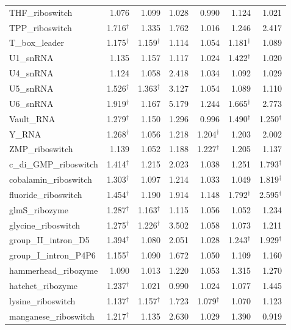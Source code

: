 \documentclass[11pt]{article}
\begin{document}
\begin{longtable}{@{}lrrrrrr@{}}
THF\_riboswitch & 1.076 & 1.099 & 1.028 & 0.990 & 1.124 & 1.021 \\
TPP\_riboswitch & 1.716$^\dagger$ & 1.335 & 1.762 & 1.016 & 1.246 & 2.417 \\
T\_box\_leader & 1.175$^\dagger$ & 1.159$^\dagger$ & 1.114 & 1.054 & 1.181$^\dagger$ & 1.089 \\
U1\_snRNA & 1.135 & 1.157 & 1.117 & 1.024 & 1.422$^\dagger$ & 1.020 \\
U4\_snRNA & 1.124 & 1.058 & 2.418 & 1.034 & 1.092 & 1.029 \\
U5\_snRNA & 1.526$^\dagger$ & 1.363$^\dagger$ & 3.127 & 1.054 & 1.089 & 1.110 \\
U6\_snRNA & 1.919$^\dagger$ & 1.167 & 5.179 & 1.244 & 1.665$^\dagger$ & 2.773 \\
Vault\_RNA & 1.279$^\dagger$ & 1.150 & 1.296 & 0.996 & 1.490$^\dagger$ & 1.250$^\dagger$ \\
Y\_RNA & 1.268$^\dagger$ & 1.056 & 1.218 & 1.204$^\dagger$ & 1.203 & 2.002 \\
ZMP\_riboswitch & 1.139 & 1.052 & 1.188 & 1.227$^\dagger$ & 1.205 & 1.137 \\
c\_di\_GMP\_riboswitch & 1.414$^\dagger$ & 1.215 & 2.023 & 1.038 & 1.251 & 1.793$^\dagger$ \\
cobalamin\_riboswitch & 1.303$^\dagger$ & 1.097 & 1.214 & 1.033 & 1.049 & 1.819$^\dagger$ \\
fluoride\_riboswitch & 1.454$^\dagger$ & 1.190 & 1.914 & 1.148 & 1.792$^\dagger$ & 2.595$^\dagger$ \\
glmS\_ribozyme & 1.287$^\dagger$ & 1.163$^\dagger$ & 1.115 & 1.056 & 1.052 & 1.234 \\
glycine\_riboswitch & 1.275$^\dagger$ & 1.226$^\dagger$ & 3.502 & 1.058 & 1.073 & 1.211 \\
group\_II\_intron\_D5 & 1.394$^\dagger$ & 1.080 & 2.051 & 1.028 & 1.243$^\dagger$ & 1.929$^\dagger$ \\
group\_I\_intron\_P4P6 & 1.155$^\dagger$ & 1.090 & 1.672 & 1.050 & 1.109 & 1.160 \\
hammerhead\_ribozyme & 1.090 & 1.013 & 1.220 & 1.053 & 1.315 & 1.270 \\
hatchet\_ribozyme & 1.237$^\dagger$ & 1.021 & 0.990 & 1.024 & 1.077 & 1.445 \\
lysine\_riboswitch & 1.137$^\dagger$ & 1.157$^\dagger$ & 1.723 & 1.079$^\dagger$ & 1.070 & 1.123 \\
manganese\_riboswitch & 1.217$^\dagger$ & 1.135 & 2.630 & 1.029 & 1.390 & 0.919 \\

\end{longtable}
\end{document}
